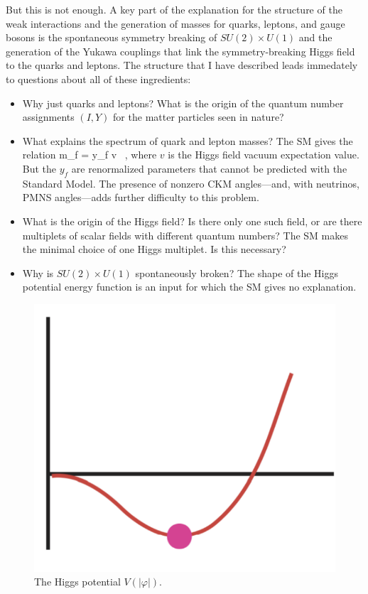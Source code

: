 \documentclass[12pt]{article}
\begin{document}
But this is not enough.   A key part of the explanation for the
structure of the weak interactions and the generation of masses for
quarks, leptons, and gauge bosons is the spontaneous symmetry breaking
of $SU(2)\times U(1)$ and the generation of the Yukawa couplings that
link the symmetry-breaking Higgs field to the quarks and leptons.
The structure that I have described leads immedately to questions
about all of these ingredients:
\begin{itemize}
\item Why just quarks and leptons?  What is the origin of the quantum
  number assignments $(I,Y)$ for the matter particles seen in nature?
\item What explains the spectrum of quark and lepton masses?   The
  SM gives the relation
\beq
    m_f =   { y_f v \over {}}   \ ,
\eeqn
where $v$ is the Higgs field vacuum expectation value.   But the $y_f$
are renormalized parameters that cannot be predicted with the Standard
Model.  The presence of nonzero CKM angles---and, with neutrinos, PMNS
angles---adds further difficulty  to this problem.
\item What is the origin of the Higgs field?  Is there only one such
  field, or are there multiplets of scalar fields with different
  quantum numbers?   The SM makes the minimal choice of
  one Higgs multiplet.   Is this necessary?
\item  Why is $SU(2)\times U(1)$ spontaneously broken?   The shape of
  the Higgs potential energy function is an input for which the
  SM gives no explanation.
\end{itemize}

\begin{figure}
\begin{center}
\includegraphics[width=0.30\hsize]{hpot.pdf}
\end{center}
\caption{The Higgs potential $V(|\varphi|)$.}
\label{fig:Higgspot}
\end{figure}
\end{document}
